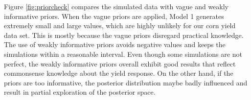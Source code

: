 \documentclass[a4paper]{article}   	%
\begin{document}
	
	
	
	Figure \ref{fig:priorcheck} compares the simulated data with vague and weakly informative priors. When the vague priors are applied, Model 1 generates extremely small and large values, which are highly unlikely for our corn yield data set. This is mostly because the vague priors disregard practical knowledge. The use of weakly informative priors avoids negative values and keeps the simulations within a reasonable interval. Even though some simulations are not perfect, the weakly informative priors overall exhibit good results that reflect commonsense knowledge about the yield response. On the other hand, if the priors are too informative, the posterior distribution maybe badly influenced and result in partial exploration of the posterior space. 
	
	
\end{document}
